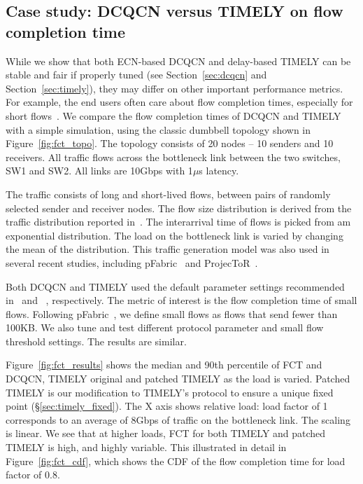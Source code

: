 \vspace{-0.3em}
\subsection {Case study: DCQCN versus TIMELY on flow completion time}
\label{sec:fct}

While we show that both ECN-based DCQCN and delay-based TIMELY can be 
stable and fair if properly tuned (see Section~\ref{sec:dcqcn} and 
Section~\ref{sec:timely}), they may differ on other important performance
metrics. For example, the end users often care about flow completion
times, especially for short flows~\cite{rcp}. We compare the flow completion 
times of DCQCN and TIMELY with 
a simple simulation, using the classic dumbbell topology shown in
Figure~\ref{fig:fct_topo}. The topology consists of 20 nodes -- 10 senders and
10 receivers. All traffic flows across the bottleneck link between the two
switches, SW1 and SW2. All links are 10Gbps with 1$\mu$s latency.

The traffic consists  of long and short-lived flows, between pairs of randomly
selected sender and receiver nodes. The flow size distribution is derived from
the traffic distribution reported in~\cite{dctcp}. The interarrival time of
flows is picked from am exponential distribution. The load on the bottleneck
link is varied by changing the mean of the distribution. This traffic generation
model was also used in several recent studies, including pFabric~\cite{pfabric}
and ProjecToR~\cite{projector}. 

Both DCQCN and TIMELY used the default parameter settings recommended
in~\cite{dcqcn} and ~\cite{timely}, respectively. 
The metric of interest is the flow completion time of small flows. Following 
pFabric~\cite{pfabric}, we define small flows as flows that send fewer than 100KB. 
We also tune and test different protocol parameter and small flow threshold settings. 
The results are similar.

Figure~\ref{fig:fct_results} shows the median and 90th percentile of FCT and
DCQCN, TIMELY original and patched TIMELY as the load is varied. Patched TIMELY is our 
modification to TIMELY's protocol to ensure a unique fixed point (\S\ref{sec:timely_fixed}). 
The X axis shows relative load: load factor of 1 corresponds to an average of 8Gbps of traffic 
on the bottleneck link. The scaling is linear. We see that at higher loads, FCT for both TIMELY 
and patched TIMELY is high, and highly variable. This illustrated in detail in 
Figure~\ref{fig:fct_cdf}, which shows the CDF of the flow completion time for
load factor of 0.8. 

